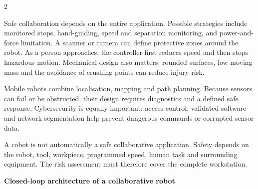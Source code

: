 \begin{multicols}{2}
\begin{ecarticle}
Safe collaboration depends on the entire application. Possible strategies include monitored stops, hand-guiding, speed and separation monitoring, and power-and-force limitation. A scanner or camera can define protective zones around the robot. As a person approaches, the controller first reduces speed and then stops hazardous motion. Mechanical design also matters: rounded surfaces, low moving mass and the avoidance of crushing points can reduce injury risk.

Mobile robots combine localisation, mapping and path planning. Because sensors can fail or be obstructed, their design requires diagnostics and a defined safe response. Cybersecurity is equally important: access control, validated software and network segmentation help prevent dangerous commands or corrupted sensor data.
\end{ecarticle}

\begin{tcolorbox}[title=\sffamily\bfseries Engineering Insight,colback=yellow!10,colframe=ECOrange]
A cobot is not automatically a safe collaborative application. Safety depends on the robot, tool, workpiece, programmed speed, human task and surrounding equipment. The risk assessment must therefore cover the complete workstation.
\end{tcolorbox}

\columnbreak

\begin{engineeringfocus}
\textbf{Closed-loop architecture of a collaborative robot}

\begin{center}
\end{center}


\end{engineeringfocus}
\end{multicols}
